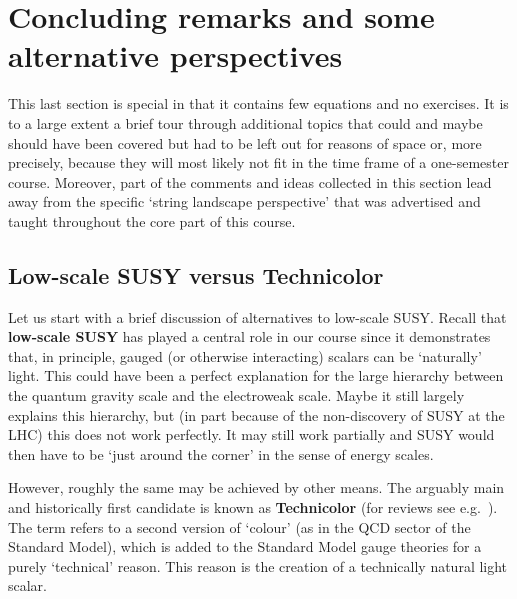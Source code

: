 \documentclass[12pt]{article}
\numberwithin{equation}{section}
\begin{document}
\section{Concluding remarks and some alternative perspectives}\label{alt}
This last section is special in that it contains few equations and no exercises. It is to a large extent a brief tour through additional topics that could and maybe should have been covered but had to be left out for reasons of space or, more precisely, because they will most likely not fit in the time frame of a one-semester course. Moreover, part of the comments and ideas collected in this section lead away from the specific `string landscape perspective' that was advertised and taught throughout the core part of this course. 







\subsection{Low-scale SUSY versus Technicolor}
\label{lsstc}

Let us start with a brief discussion of alternatives to low-scale SUSY. Recall that {\bf low-scale SUSY} has played a central role in our course since it demonstrates that, in principle, gauged (or otherwise interacting) scalars can be `naturally' light. This could have been a perfect explanation for the large hierarchy between the quantum gravity scale and the electroweak scale. Maybe it still largely explains this hierarchy, but (in part because of the non-discovery of SUSY at the LHC) this does not work perfectly. It may still work partially and SUSY would then have to be `just around the corner' in the sense of energy scales.

However, roughly the same may be achieved by other means. The arguably main and historically first candidate is known as {\bf Technicolor} \cite{Weinberg:1975gm, Susskind:1978ms, Dimopoulos:1979es, Eichten:1979ah, Kaplan:1983fs, Bardeen:1989ds} (for reviews see e.g.~\cite{King:1994yr, Chivukula:1998if, Lane:2002wv, Hill:2002ap, Piai:2010ma, Cacciapaglia:2020kgq}). The term refers to a second version of `colour' (as in the QCD sector of the Standard Model), which is added to the Standard Model gauge theories for a purely `technical' reason. This reason is the creation of a technically natural light scalar.
\end{document}
